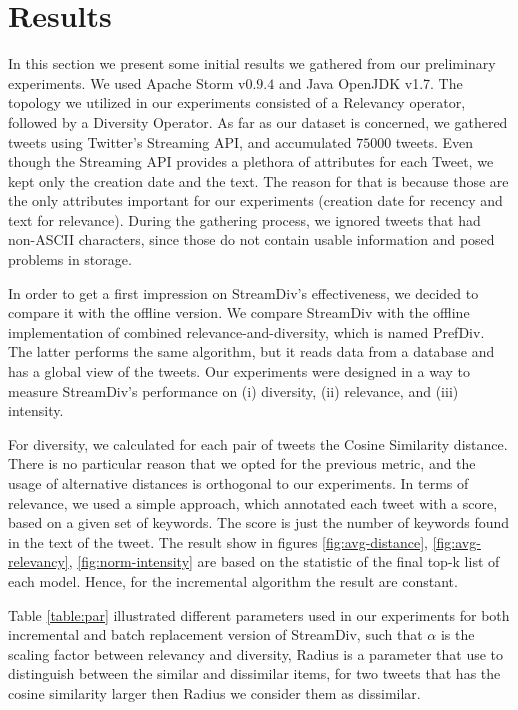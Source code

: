 \section{Results} 
In this section we present some initial results we
gathered from our preliminary experiments.
We used Apache Storm v$0.9.4$ and Java
OpenJDK v1.7. The topology we utilized in our experiments
consisted of a Relevancy operator, followed by a
Diversity Operator.
As far as our dataset is concerned,
we gathered tweets using Twitter's Streaming API,
and accumulated $75000$ tweets.
Even though the Streaming API provides a
plethora of attributes for each Tweet, we
kept only the creation date and the text.
The reason for that is because those are
the only attributes important for our experiments
(creation date for recency and text for relevance).
During the gathering process, we ignored tweets
that had non-ASCII characters, since those do
not contain usable information and posed
problems in storage.

In order to get a first impression on StreamDiv's
effectiveness, we decided to compare it with the
offline version.
We compare StreamDiv with the offline implementation
of combined relevance-and-diversity, which is named
PrefDiv. The latter performs the same
algorithm, but it reads data from a database
and has a global view of the tweets.
Our experiments were designed in a way to measure
StreamDiv's performance on (i) diversity, (ii) relevance,
and (iii) intensity.

For diversity, we calculated for each pair of tweets
the Cosine Similarity distance. There is no particular
reason that we opted for the previous metric, and the
usage of alternative distances is orthogonal to our
experiments. In terms of relevance, we used a simple
approach, which annotated each tweet with a score,
based on a given set of keywords.
The score is just the number of
keywords found in the text of the tweet.
The result show in figures \ref{fig:avg-distance}, \ref{fig:avg-relevancy}, \ref{fig:norm-intensity}
are based on the statistic of the final top-k list of each model. Hence, for the incremental algorithm the result are constant.

Table \ref{table:par} illustrated different parameters used in our experiments for both incremental and batch replacement version of StreamDiv, such that $\alpha$ is the scaling factor between relevancy and diversity,
Radius is a parameter that use to distinguish between the similar and dissimilar items, for two tweets that has the cosine similarity larger then Radius 
we consider them as dissimilar.

